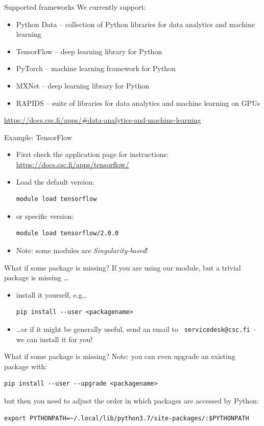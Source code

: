 \documentclass[aspectratio=1610,14pt]{beamer}
\newcommand{\link}[1]{\alert{\url{#1}}}
\newcommand{\vitem}{\vfill\item}
\begin{document}
\begin{frame}{Supported frameworks}
  We currently support:
  \begin{itemize}
  \item \alert{Python Data} -- collection of Python libraries for data
    analytics and machine learning
  \item \alert{TensorFlow} -- deep learning library for Python
  \item \alert{PyTorch} -- machine learning framework for Python
  \item \alert{MXNet} -- deep learning library for Python
  \item \alert{RAPIDS} -- suite of libraries for data analytics and
    machine learning on GPUs
  \end{itemize}

  {\small \link{https://docs.csc.fi/apps/\#data-analytics-and-machine-learning}}
\end{frame}

\begin{frame}[fragile]{Example: TensorFlow}
  \begin{itemize}
  \vitem First check the application page for instructions:
    \link{https://docs.csc.fi/apps/tensorflow/}
  \vitem Load the default version:
\begin{verbatim}
module load tensorflow
\end{verbatim}
  \vitem or specific version:
\begin{verbatim}
module load tensorflow/2.0.0
\end{verbatim}
  \vitem \alert{Note:} some modules are \emph{Singularity-based}!
\end{itemize}
\vfill
\end{frame}

\begin{frame}[fragile]{What if some package is missing?}
  If you are using our module, but a trivial package is missing \ldots
  \begin{itemize}
  \vitem install it yourself, e.g.,
\begin{verbatim}
pip install --user <packagename>
\end{verbatim}
  \vitem \ldots or if it might be generally useful, send an email to \alert{\tt
      servicedesk@csc.fi} -- we can install it for you!
  \end{itemize}
  \vfill
\end{frame}

\begin{frame}[fragile]{What if some package is missing?}
  \alert{Note:} you can even upgrade an existing package with:
\begin{verbatim}
pip install --user --upgrade <packagename>
\end{verbatim}
  but then you need to adjust the order in which packages are accessed by Python:
{\small
\begin{verbatim}
export PYTHONPATH=~/.local/lib/python3.7/site-packages/:$PYTHONPATH  
\end{verbatim}}
\end{frame}
\end{document}
